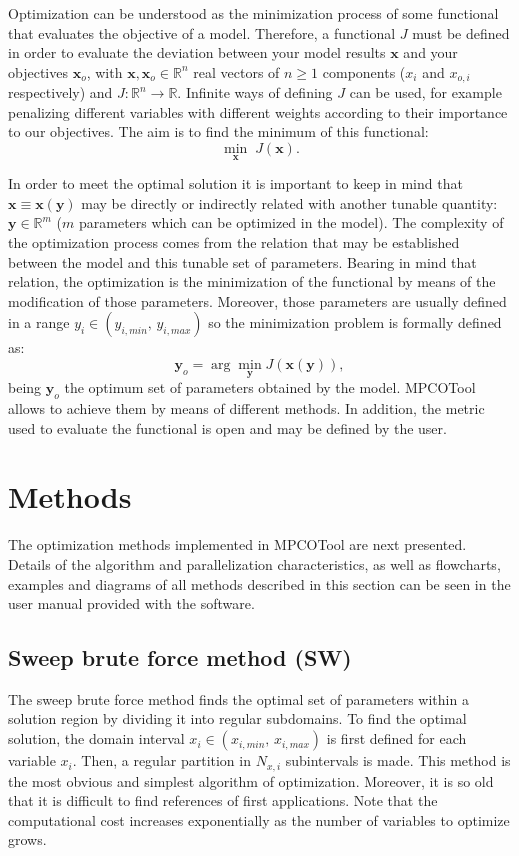 \documentclass[review,authoryear]{elsarticle}
\newcommand{\EQ}[2]
{\begin{equation}#1\label{#2}\end{equation}}
\newcommand{\PA}[1]{\left(#1\right)}
\begin{document}
Optimization can be understood as the minimization process of some functional
that evaluates the objective of a model. Therefore, a functional $J$ must be
defined in order to evaluate the deviation between your model results
$\mathbf{x}$ and your objectives $\mathbf{x}_o$, with
$\mathbf{x},\mathbf{x}_o\in\mathbb{R}^n$ real vectors of $n\ge 1$
components ($x_i$ and $x_{o,i}$ respectively) and
$J:\mathbb{R}^n \rightarrow \mathbb{R}$. 
Infinite ways of defining $J$ can be used, for example penalizing different
variables with different weights according to their importance to our
objectives. The aim is to find the minimum of this functional:
\EQ{\min_{\mathbf{x}}\;J\PA{\mathbf{x}}.}{EqFunctionalMin}

In order to meet the optimal solution it is important to keep in mind that
$\mathbf{x}\equiv\mathbf{x}\PA{\mathbf{y}}$ may be directly or indirectly
related with another tunable quantity: $\mathbf{y}\in\mathbb{R}^m$  ($m$
parameters which can be optimized in the model). The complexity of the
optimization process comes from the relation that may be established between the
model and this tunable set of parameters. Bearing in mind that relation, the
optimization is the minimization of the functional by means of the modification
of those parameters. Moreover, those parameters are usually defined in a range
$y_i\in\PA{y_{i,min},\,y_{i,max}}$ so the minimization problem is formally
defined as:
\EQ
{
	\mathbf{y}_o=\arg\min_{\mathbf{y}}J\PA{\mathbf{x}\PA{\mathbf{y}}},
}{EqParametersOptimal}
being $\mathbf{y}_o$ the optimum set of parameters obtained by the model.
MPCOTool allows to achieve them by means of different methods. In addition,
the metric used to evaluate the functional is open and may be defined by the
user.

\section{Methods}

The optimization methods implemented in MPCOTool are next presented.
Details of the algorithm and parallelization characteristics, as well as
flowcharts, examples and diagrams of all methods described in this section can
be seen in the user manual provided with the software.

\subsection{Sweep brute force method (SW)}

The sweep brute force method finds the optimal set of parameters within a solution region by dividing it into regular subdomains. To find the optimal solution, the domain interval $x_i \in \PA{x_{i,min},\,x_{i,max}}$ is first defined for each variable $x_i$. Then, a regular partition in  $N_{x,i}$ subintervals is made. This method is the most obvious and simplest algorithm of optimization. Moreover, it is so old that it is difficult to find references of first applications. Note that the computational cost increases exponentially as the number of variables to optimize grows.
\end{document}
